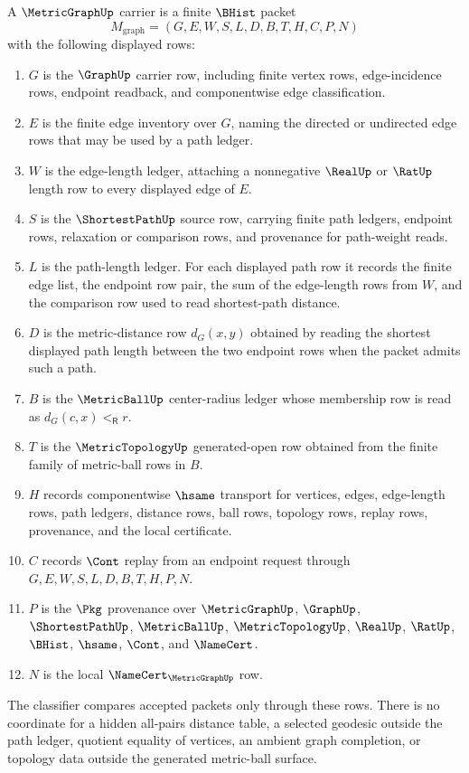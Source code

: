 \begin{definition}
\label{def:metric-graph-carrier}
A $\MetricGraphUp$ carrier is a finite $\BHist$ packet
$$
M_{\mathrm{graph}}=(G,E,W,S,L,D,B,T,H,C,P,N)
$$
with the following displayed rows:
\begin{enumerate}
\item $G$ is the $\GraphUp$ carrier row, including finite vertex rows, edge-incidence rows, endpoint readback, and componentwise edge classification.
\item $E$ is the finite edge inventory over $G$, naming the directed or undirected edge rows that may be used by a path ledger.
\item $W$ is the edge-length ledger, attaching a nonnegative $\RealUp$ or $\RatUp$ length row to every displayed edge of $E$.
\item $S$ is the $\ShortestPathUp$ source row, carrying finite path ledgers, endpoint rows, relaxation or comparison rows, and provenance for path-weight reads.
\item $L$ is the path-length ledger. For each displayed path row it records the finite edge list, the endpoint row pair, the sum of the edge-length rows from $W$, and the comparison row used to read shortest-path distance.
\item $D$ is the metric-distance row $d_G(x,y)$ obtained by reading the shortest displayed path length between the two endpoint rows when the packet admits such a path.
\item $B$ is the $\MetricBallUp$ center-radius ledger whose membership row is read as $d_G(c,x)<_{\mathsf R}r$.
\item $T$ is the $\MetricTopologyUp$ generated-open row obtained from the finite family of metric-ball rows in $B$.
\item $H$ records componentwise $\hsame$ transport for vertices, edges, edge-length rows, path ledgers, distance rows, ball rows, topology rows, replay rows, provenance, and the local certificate.
\item $C$ records $\Cont$ replay from an endpoint request through $G,E,W,S,L,D,B,T,H,P,N$.
\item $P$ is the $\Pkg$ provenance over $\MetricGraphUp$, $\GraphUp$, $\ShortestPathUp$, $\MetricBallUp$, $\MetricTopologyUp$, $\RealUp$, $\RatUp$, $\BHist$, $\hsame$, $\Cont$, and $\NameCert$.
\item $N$ is the local $\NameCert_{\MetricGraphUp}$ row.
\end{enumerate}
The classifier compares accepted packets only through these rows. There is no coordinate for a hidden all-pairs distance table, a selected geodesic outside the path ledger, quotient equality of vertices, an ambient graph completion, or topology data outside the generated metric-ball surface.
\end{definition}

